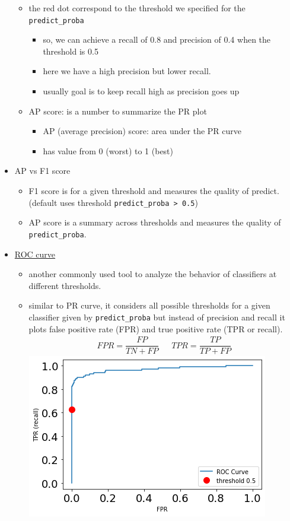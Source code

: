\documentclass[10.5pt,a4paper, fleqn, dvipsnames]{article}
\begin{document}
\begin{itemize}
    \begin{itemize}
        \item the red dot correspond to the threshold we specified for the \lstinline{predict_proba}
        \begin{itemize}[leftmargin = 2em]
            \item so, we can achieve a recall of 0.8 and precision of 0.4 when the threshold is 0.5
            \item here we have a high precision but lower recall.
            \item usually goal is to keep recall high as precision goes up
        \end{itemize}
        \item AP score: is a number to summarize the PR plot
        \begin{itemize}[leftmargin = 2em]
            \item AP (average precision) score: area under the PR curve
            \item has value from 0 (worst) to 1 (best)
        \end{itemize}
    \end{itemize}
    \item AP vs F1 score
    \begin{itemize}
        \item F1 score is for a given threshold and measures the quality of predict. (default uses threshold \lstinline{predict_proba > 0.5})
        \item AP score is a summary across thresholds and measures the quality of \lstinline{predict_proba}.
    \end{itemize}
    \item \ul{ROC curve}
    \begin{itemize}
        \item another commonly used tool to analyze the behavior of classifiers at different thresholds.
        \item similar to PR curve, it considers all possible thresholds for a given classifier given by \lstinline{predict_proba} but instead of precision and recall it plots false positive rate (FPR) and true positive rate (TPR or recall).
        \begin{align*}
            FPR = \dfrac{FP}{TN + FP} ~~~~~~~ TPR = \dfrac{TP}{TP+FP}
        \end{align*}
        \includegraphics[scale = 0.65]{roc-curve.png}

\end{itemize}
\end{itemize}
\end{document}
